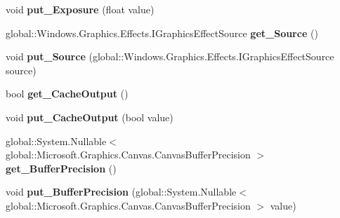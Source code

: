 \begin{DoxyCompactItemize}
\item 
\mbox{\label{class_microsoft_1_1_graphics_1_1_canvas_1_1_effects_1_1_exposure_effect_ae2886e4afaf9fb5cc87189bfa0b30600}} 
void {\bfseries put\+\_\+\+Exposure} (float value)
\item 
\mbox{\label{class_microsoft_1_1_graphics_1_1_canvas_1_1_effects_1_1_exposure_effect_a3a4a21d04c4c1e3ab6ff7ab1a75397c8}} 
global\+::\+Windows.\+Graphics.\+Effects.\+I\+Graphics\+Effect\+Source {\bfseries get\+\_\+\+Source} ()
\item 
\mbox{\label{class_microsoft_1_1_graphics_1_1_canvas_1_1_effects_1_1_exposure_effect_ad8302b23b9b65d3b241aa0a15850c411}} 
void {\bfseries put\+\_\+\+Source} (global\+::\+Windows.\+Graphics.\+Effects.\+I\+Graphics\+Effect\+Source source)
\item 
\mbox{\label{class_microsoft_1_1_graphics_1_1_canvas_1_1_effects_1_1_exposure_effect_a6d781774b332d50000568372636dd32c}} 
bool {\bfseries get\+\_\+\+Cache\+Output} ()
\item 
\mbox{\label{class_microsoft_1_1_graphics_1_1_canvas_1_1_effects_1_1_exposure_effect_a173a563c6748ed7d1a15e042ffd9f8b1}} 
void {\bfseries put\+\_\+\+Cache\+Output} (bool value)
\item 
\mbox{\label{class_microsoft_1_1_graphics_1_1_canvas_1_1_effects_1_1_exposure_effect_a0268884188c61936111851732b91ddbb}} 
global\+::\+System.\+Nullable$<$ global\+::\+Microsoft.\+Graphics.\+Canvas.\+Canvas\+Buffer\+Precision $>$ {\bfseries get\+\_\+\+Buffer\+Precision} ()
\item 
\mbox{\label{class_microsoft_1_1_graphics_1_1_canvas_1_1_effects_1_1_exposure_effect_a66640d733ee7a12182cdf5db5fd6246e}} 
void {\bfseries put\+\_\+\+Buffer\+Precision} (global\+::\+System.\+Nullable$<$ global\+::\+Microsoft.\+Graphics.\+Canvas.\+Canvas\+Buffer\+Precision $>$ value)

\end{DoxyCompactItemize}
